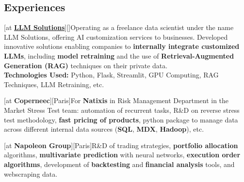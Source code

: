 \documentclass[a4paper]{arthur-cv}
\begin{document}
\begin{textblock}{20.5}
\begin{minipage}[t]{0.37\textwidth}
  \end{minipage}\hfill\begin{minipage}[t]{0.61\textwidth}

  
    \section{Experiences}
      \begin{rightenv}
        [at \textbf{\href{https://llm-solutions.fr/}{LLM Solutions}}][]{Operating as a freelance data scientist under the name LLM Solutions, offering AI customization services to businesses. Developed innovative solutions enabling companies to \textbf{internally integrate customized LLMs}, including \textbf{model retraining} and the use of \textbf{Retrieval-Augmented Generation (RAG)} techniques on their private data.\\\textbf{Technologies Used:} Python, Flask, Streamlit, GPU Computing, RAG Techniques, LLM Retraining, etc.}

        [at \textbf{Coperneec}][Paris]{For \textbf{Natixis} in Risk Management Department in the Market Stress Test team: automation of recurrent tasks, R\&D on reverse stress test methodology, \textbf{fast pricing of products}, python package to manage data across different internal data sources (\textbf{SQL}, \textbf{MDX}, \textbf{Hadoop}), etc.}

        [at \textbf{Napoleon Group}][Paris]{R\&D of trading strategies, \textbf{portfolio allocation} algorithms, \textbf{multivariate prediction} with neural networks, \textbf{execution order algorithms}, development of \textbf{backtesting} and \textbf{financial analysis} tools, and webscraping data.}
      \end{rightenv}


\end{minipage}
\end{textblock}
\end{document}
